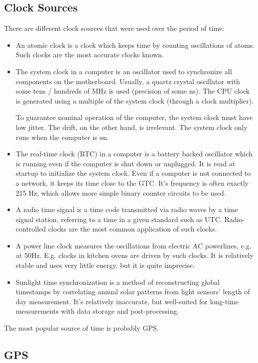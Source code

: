 \subsection{Clock Sources}

There are different clock sources that were used over the period of time:
\begin{itemize}
	\item An atomic clock is a clock which keeps time by counting oscillations of atoms. Such clocks are the most accurate clocks known.
	\item The system clock in a computer is an oscillator used to synchronize all components on the motherboard. Usually, a quartz crystal oscillator with some tens / hundreds of MHz is used (precision of some ns). The CPU clock is generated using a multiple of the system clock (through a clock multiplier). \smallskip

		To guarantee nominal operation of the computer, the system clock must have low jitter. The drift, on the other hand, is irrelevant. The system clock only runs when the computer is on.
	\item The real-time clock (RTC) in a computer is a battery backed oscillator which is running even if the computer is shut down or unplugged. It is read at startup to initialize the system clock. Even if a computer is not connected to a network, it keeps its time close to the GTC. It's frequency is often exactly 215 Hz, which allows more simple binary counter circuits to be used.
	\item A radio time signal is a time code transmitted via radio waves by a time signal station, referring to a time in a given standard such as UTC. Radio-controlled clocks are the most common application of such clocks.
	\item A power line clock measures the oscillations from electric AC powerlines, e.g. at 50Hz. E.g. clocks in kitchen ovens are driven by such clocks. It is relatively stable and uses very little energy, but it is quite imprecise.
	\item Sunlight time synchronization is a method of reconstructing global timestamps by correlating annual solar patterns from light sensors’ length of day measurement. It’s relatively inaccurate, but well-suited for long-time measurements with data storage and post-processing.
\end{itemize}

The most popular source of time is probably GPS.


\subsection{GPS}

